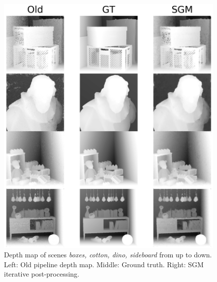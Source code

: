 \documentclass  [
  paper    = a4,
  BCOR     = 10mm,
  twoside,
  fontsize = 12pt,
  fleqn,
  toc      = bibnumbered,
  toc      = listofnumbered,
  numbers  = noendperiod,
  headings = normal,
  listof   = leveldown,
  version  = 3.03
]                                       {scrreprt}
\begin{document}
\begin{figure}[h!]
	\centering
	\includegraphics[width=0.8\linewidth]{images/sgm_results_iterative.png}
	\caption[Iterative SGM: depth maps]{Depth map of scenes \textit{boxes, cotton, dino, sideboard} from up to down. Left: Old pipeline depth map. Middle: Ground truth. Right: SGM iterative post-processing.}
	\label{fig:sgmresultsiterative}
\end{figure}
\newpage
\end{document}
